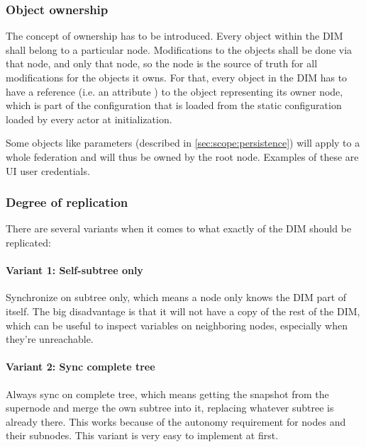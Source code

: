 \subsubsection{Object ownership}
The concept of ownership has to be introduced. Every object within the DIM
shall belong to a particular node. Modifications to the objects shall be done via
that node, and only that node, so the node is the source of truth for all modifications for the
objects it owns. For that, every object in the DIM has to have a reference
(i.e. an attribute ) to the object representing its owner node, which is part of
the configuration that is loaded from the static configuration loaded by every
actor at initialization.

Some objects like parameters (described in \autoref{sec:scope:persistence})
will apply to a whole federation and will thus be owned by the root node.
Examples of these are UI user credentials.

\subsubsection{Degree of replication}
There are several variants when it comes to what exactly of the DIM should be replicated:

\paragraph{Variant 1: Self-subtree only}
Synchronize on subtree only, which means a node only knows the DIM part of
itself. The big disadvantage is that it will not have a copy of the rest of the
DIM, which can be useful to inspect variables on neighboring nodes, especially
when they're unreachable.


\paragraph{Variant 2: Sync complete tree}\label{par:approach:dim:var2}
Always sync on complete tree, which means getting the snapshot from the
supernode and merge the own subtree into it, replacing whatever subtree is
already there. This works because of the autonomy requirement for nodes and
their subnodes. This variant is very easy to implement at first.

